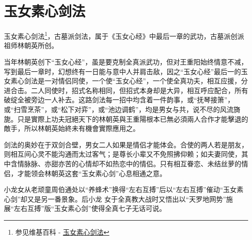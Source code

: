 \chapter{玉女素心剑法}
玉女素心剑法\footnote{参见维基百科 - \href{http://zh.wikipedia.org/wiki/\%E7\%8E\%89\%E5\%A5\%B3\%E7\%B4\%A0\%E5\%BF\%83\%E5\%89\%91\%E6\%B3\%95}{玉女素心剑法}}，古墓派剑法，属于《玉女心经》中最后一章的武功，古墓派创派祖师林朝英所创\cite{ynxj}。

当年林朝英创下“玉女心经”，虽是要克制全真派武功，但对王重阳始终情意不减，写到最后一章时，幻想终有一日能与意中人并肩击敌，因之“玉女心经”最后一的玉女素心剑法是一对情侣同使，一个使“玉女心经”，一个使全真功夫，相互应援，分进合击。二人同使时，招式名称相同，但招式本身却是大异，相互呼应配合，所有破绽全被旁边一人补去。这路剑法每一招中均含着一件韵事，或“抚琴接箫”，或“扫雪烹茶”，或“松下对弈”，或“池边调鹤”，均是男女与共，说不尽的风流旖旎。只是實際上功夫冠絕天下的林朝英與王重陽根本已無必須兩人合作才能擊退的敵手，所以林朝英始終未有機會實際應用之。

剑法的奥妙在于双剑合壁，男女二人如果是情侣才能体会。合使的两人若是朋友，则相互间心灵不能沟通而太过客气；是尊长小辈又不免照拂仰赖；如夫妻同使，其中含情脉脉、亦甜亦苦的心情却不如热恋中的情侣。只有相互眷恋、未结丝萝的情侣，才能领会林朝英这套“玉女素心剑”心息相通之意。

小龙女从老顽童周伯通处以“养蜂术”换得“左右互搏”后以“左右互搏”催动“玉女素心剑”却又是另一番景象。后小龙
女于全真教大战时又悟出以“天罗地网势”施展“左右互搏”版“玉女素心剑”使得全真七子无话可说。

